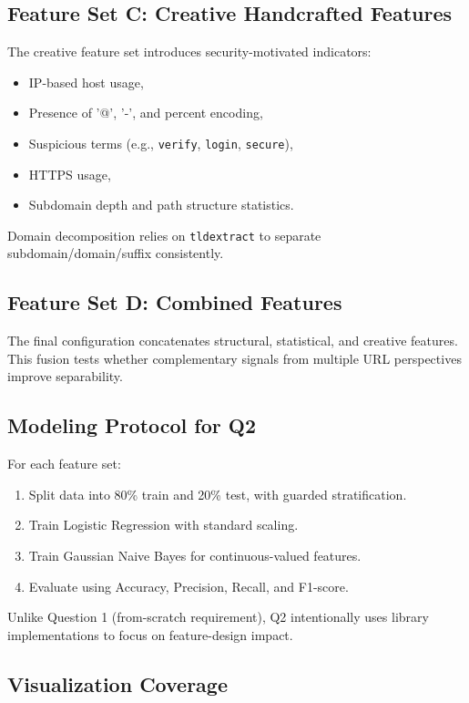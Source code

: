 \subsection{Feature Set C: Creative Handcrafted Features}

The creative feature set introduces security-motivated indicators:
\begin{itemize}
    \item IP-based host usage,
    \item Presence of '@', '-', and percent encoding,
    \item Suspicious terms (e.g., \texttt{verify}, \texttt{login}, \texttt{secure}),
    \item HTTPS usage,
    \item Subdomain depth and path structure statistics.
\end{itemize}

Domain decomposition relies on \texttt{tldextract} \cite{tldextract} to separate subdomain/domain/suffix consistently.

\subsection{Feature Set D: Combined Features}

The final configuration concatenates structural, statistical, and creative features. This fusion tests whether complementary signals from multiple URL perspectives improve separability.

\subsection{Modeling Protocol for Q2}

For each feature set:
\begin{enumerate}
    \item Split data into 80\% train and 20\% test, with guarded stratification.
    \item Train Logistic Regression with standard scaling.
    \item Train Gaussian Naive Bayes for continuous-valued features.
    \item Evaluate using Accuracy, Precision, Recall, and F1-score.
\end{enumerate}

Unlike Question 1 (from-scratch requirement), Q2 intentionally uses library implementations to focus on feature-design impact.

\subsection{Visualization Coverage}

